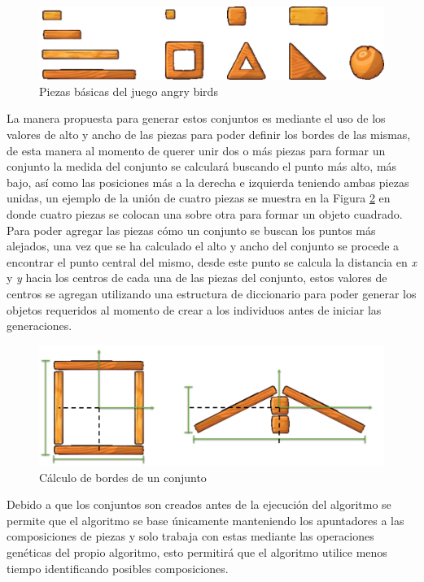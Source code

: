 \begin{figure}
  \centering
  \includegraphics[width=1.0\textwidth]{img/list_pieces.png}
  \caption{Piezas básicas del juego angry birds}
  \label{figure:game-basic-blocks}
\end{figure}

La manera propuesta para generar estos conjuntos es mediante el uso de los
valores de alto y ancho de las piezas para poder definir los bordes de las
mismas, de esta manera al momento de querer unir dos o más piezas para formar un
conjunto la medida del conjunto se calculará buscando el punto más alto, más
bajo, así como las posiciones más a la derecha e izquierda teniendo ambas piezas
unidas, un ejemplo de la unión de cuatro piezas se muestra en la Figura
\ref{figure:bounding-box-calculation} en donde cuatro piezas se colocan una
sobre otra para formar un objeto cuadrado. Para poder agregar las piezas cómo
un conjunto se buscan los puntos más alejados, una vez que se ha calculado el
alto y ancho del conjunto se procede a encontrar el punto central del mismo,
desde este punto se calcula la distancia en \textit{x} y \textit{y} hacia los
centros de cada una de las piezas del conjunto, estos valores de centros se
agregan utilizando una estructura de diccionario para poder generar los objetos requeridos al
momento de crear a los individuos antes de iniciar las generaciones.

\begin{figure}
  \centering
  \includegraphics[width=1.0\textwidth]{img/bounding_box_calculation.png}
  \caption{Cálculo de bordes de un conjunto}
  \label{figure:bounding-box-calculation}
\end{figure}

Debido a que los conjuntos son creados antes de la ejecución del algoritmo se
permite que el algoritmo se base únicamente manteniendo los apuntadores a las
composiciones de piezas y solo trabaja con estas mediante las operaciones
genéticas del propio algoritmo, esto permitirá que el algoritmo utilice menos
tiempo identificando posibles composiciones.

